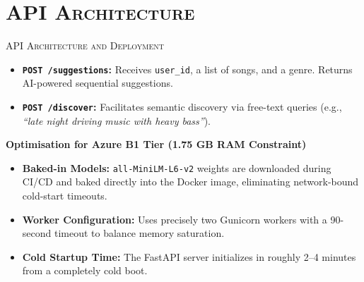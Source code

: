 \documentclass[xcolor=dvipsnames, aspectratio=1610]{beamer}
\begin{document}
\section{\textsc{API Architecture}}
\begin{frame}{\textsc{API Architecture and Deployment}}

  \begin{itemize}
    \item \textbf{\texttt{POST /suggestions}:} Receives \texttt{user\_id}, a list of songs, and a genre. Returns AI-powered sequential suggestions.
    \item \textbf{\texttt{POST /discover}:} Facilitates semantic discovery via free-text queries (e.g., \textit{``late night driving music with heavy bass''}).
  \end{itemize}

  \vspace{2.5mm}
  \begin{ExampleBox}
    \textbf{Optimisation for Azure B1 Tier (1.75 GB RAM Constraint)}
    \begin{itemize}
      \item \textbf{Baked-in Models:} \texttt{all-MiniLM-L6-v2} weights are downloaded during CI/CD and baked directly into the Docker image, eliminating network-bound cold-start timeouts.
      \item \textbf{Worker Configuration:} Uses precisely two Gunicorn workers with a 90-second timeout to balance memory saturation.
      \item \textbf{Cold Startup Time:} The FastAPI server initializes in roughly 2–4 minutes from a completely cold boot.
    \end{itemize}
  \end{ExampleBox}

\end{frame}
\end{document}
